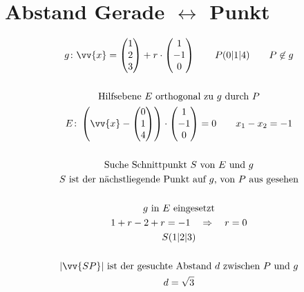 \section{Abstand Gerade $\leftrightarrow$ Punkt}
\begin{gather*}
  g \colon \vv{x} = \begin{pmatrix}1 \\ 2 \\ 3\end{pmatrix} + r \cdot \begin{pmatrix}1 \\ -1 \\ 0\end{pmatrix} \qquad P(0|1|4) \qquad P \not\in g \\\\
  \text{Hilfsebene $E$ orthogonal zu $g$ durch $P$} \\
  E \colon \left(\vv{x} - \begin{pmatrix}0 \\ 1 \\ 4\end{pmatrix} \right) \cdot \begin{pmatrix}1 \\ -1 \\ 0\end{pmatrix} = 0 \qquad x_1 - x_2 = -1 \\\\
  \text{Suche Schnittpunkt $S$ von $E$ und $g$} \\
  \text{$S$ ist der nächstliegende Punkt auf $g$, von $P$ aus gesehen} \\\\
  \text{$g$ in $E$ eingesetzt} \\
  1 + r - 2 + r = -1 \quad\Rightarrow\quad r = 0 \\
  S(1|2|3) \\\\
  \text{$|\vv{SP}|$ ist der gesuchte Abstand $d$ zwischen $P$ und $g$} \\
  d = \sqrt{3}
\end{gather*}
